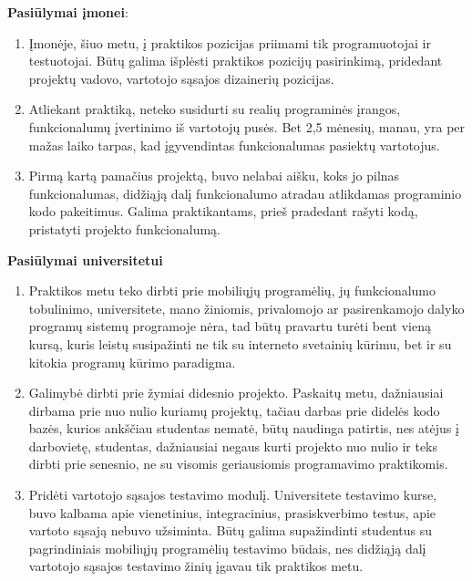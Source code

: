 \textbf{Pasiūlymai įmonei}:
\begin{enumerate}
    \item Įmonėje, šiuo metu, į praktikos pozicijas priimami tik programuotojai ir testuotojai. Būtų galima išplėsti praktikos pozicijų pasirinkimą, pridedant projektų vadovo, vartotojo sąsajos dizainerių pozicijas.
    \item Atliekant praktiką, neteko susidurti su realių programinės įrangos, funkcionalumų įvertinimo iš vartotojų pusės. Bet 2,5 mėnesių, manau, yra per mažas laiko tarpas, kad įgyvendintas funkcionalumas pasiektų vartotojus.
    \item Pirmą kartą pamačius projektą, buvo nelabai aišku, koks jo pilnas funkcionalumas, didžiąją dalį funkcionalumo atradau atlikdamas programinio kodo pakeitimus. Galima praktikantams, prieš pradedant rašyti kodą, pristatyti projekto funkcionalumą.
\end{enumerate}


\textbf{Pasiūlymai universitetui}
\begin{enumerate}
    \item Praktikos metu teko dirbti prie mobiliųjų programėlių, jų funkcionalumo tobulinimo, universitete, mano žiniomis, privalomojo ar pasirenkamojo dalyko programų sistemų programoje nėra, tad būtų pravartu turėti bent vieną kursą, kuris leistų susipažinti ne tik su interneto svetainių kūrimu, bet ir su kitokia programų kūrimo paradigma.
    \item Galimybė dirbti prie žymiai didesnio projekto. Paskaitų metu, dažniausiai dirbama prie nuo nulio kuriamų projektų, tačiau darbas prie didelės kodo bazės, kurios ankščiau studentas nematė, būtų naudinga patirtis, nes atėjus į darbovietę, studentas, dažniausiai negaus kurti projekto nuo nulio ir teks dirbti prie senesnio, ne su visomis geriausiomis programavimo praktikomis.
    \item Pridėti vartotojo sąsajos testavimo modulį. Universitete testavimo kurse, buvo kalbama apie vienetinius, integracinius, prasiskverbimo testus, apie vartoto sąsają nebuvo užsiminta. Būtų galima supažindinti studentus su pagrindiniais mobiliųjų programėlių testavimo būdais, nes didžiąją dalį vartotojo sąsajos testavimo žinių įgavau tik praktikos metu. 
\end{enumerate}